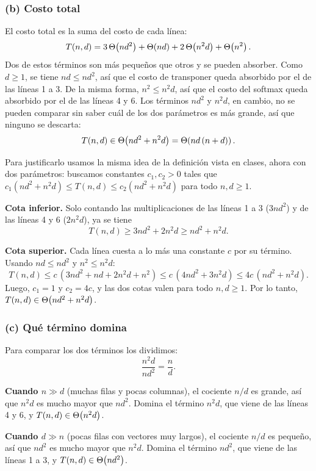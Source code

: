 \subsubsection*{(b) Costo total}

El costo total es la suma del costo de cada línea:
\[
  T(n, d) = 3\,\Theta\!\left(n d^2\right) + \Theta\!\left(n d\right) + 2\,\Theta\!\left(n^2 d\right) + \Theta\!\left(n^2\right).
\]
Dos de estos términos son más pequeños que otros y se pueden absorber. Como $d \ge 1$, se
tiene $n d \le n d^2$, así que el costo de transponer queda absorbido por el de las
líneas 1 a 3. De la misma forma, $n^2 \le n^2 d$, así que el costo del softmax queda
absorbido por el de las líneas 4 y 6. Los términos $n d^2$ y $n^2 d$, en cambio, no se
pueden comparar sin saber cuál de los dos parámetros es más grande, así que ninguno se
descarta:
\[
  T(n, d) \in \Theta\!\left(n d^2 + n^2 d\right) = \Theta\!\left(n d\,(n + d)\right).
\]

Para justificarlo usamos la misma idea de la definición vista en clases, ahora con dos
parámetros: buscamos constantes $c_1, c_2 > 0$ tales que
$c_1 (n d^2 + n^2 d) \le T(n, d) \le c_2 (n d^2 + n^2 d)$ para todo $n, d \ge 1$.

\textbf{Cota inferior.} Solo contando las multiplicaciones de las líneas 1 a 3 ($3 n d^2$)
y de las líneas 4 y 6 ($2 n^2 d$), ya se tiene
\[
  T(n, d) \ge 3 n d^2 + 2 n^2 d \ge n d^2 + n^2 d.
\]

\textbf{Cota superior.} Cada línea cuesta a lo más una constante $c$ por su término. Usando
$n d \le n d^2$ y $n^2 \le n^2 d$:
\[
  T(n, d) \le c\,(3 n d^2 + n d + 2 n^2 d + n^2) \le c\,(4 n d^2 + 3 n^2 d)
          \le 4c\,(n d^2 + n^2 d).
\]
Luego, $c_1 = 1$ y $c_2 = 4c$, y las dos cotas valen para todo $n, d \ge 1$. Por lo
tanto, $T(n, d) \in \Theta\!\left(n d^2 + n^2 d\right)$.

\subsubsection*{(c) Qué término domina}

Para comparar los dos términos los dividimos:
\[
  \frac{n^2 d}{n d^2} = \frac{n}{d}.
\]

\textbf{Cuando $n \gg d$} (muchas filas y pocas columnas), el cociente $n/d$ es grande, así que $n^2 d$ es mucho mayor
que $n d^2$. Domina el término $n^2 d$, que viene de las líneas 4 y 6, y
$T(n, d) \in \Theta\!\left(n^2 d\right)$.

\textbf{Cuando $d \gg n$} (pocas filas con vectores muy largos), el cociente $n/d$ es
pequeño, así que $n d^2$ es mucho mayor que $n^2 d$. Domina el término $n d^2$, que viene
de las líneas 1 a 3, y $T(n, d) \in \Theta\!\left(n d^2\right)$.


